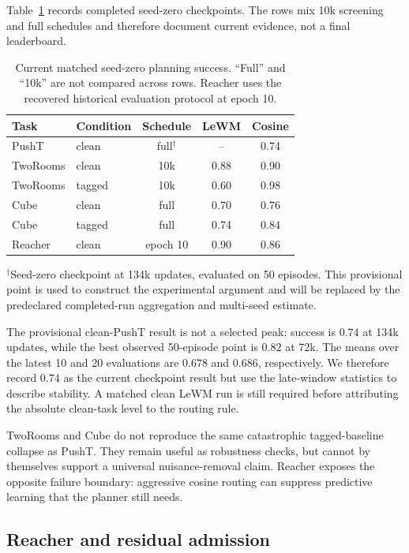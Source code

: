Table~\ref{tab:cross-task} records completed seed-zero checkpoints.  The rows
mix 10k screening and full schedules and therefore document current evidence,
not a final leaderboard.

\begin{table}[t]
\centering
\small
\caption{Current matched seed-zero planning success. ``Full'' and ``10k'' are
not compared across rows. Reacher uses the recovered historical evaluation
protocol at epoch 10.}
\label{tab:cross-task}
\begin{tabular}{llccc}
\toprule
Task & Condition & Schedule & LeWM & Cosine \shortmethod{} \\
\midrule
PushT   & clean  & full$^\dagger$ & --   & 0.74 \\
TwoRooms & clean  & 10k  & 0.88 & 0.90 \\
TwoRooms & tagged & 10k  & 0.60 & 0.98 \\
Cube     & clean  & full & 0.70 & 0.76 \\
Cube     & tagged & full & 0.74 & 0.84 \\
Reacher  & clean  & epoch 10 & 0.90 & 0.86 \\
\bottomrule
\end{tabular}
\vspace{1mm}

\footnotesize{$^\dagger$Seed-zero checkpoint at 134k updates, evaluated on
50 episodes.  This provisional point is used to construct the experimental
argument and will be replaced by the predeclared completed-run aggregation and
multi-seed estimate.}
\end{table}

The provisional clean-PushT result is not a selected peak: success is $0.74$
at 134k updates, while the best observed 50-episode point is $0.82$ at 72k.
The means over the latest 10 and 20 evaluations are $0.678$ and $0.686$,
respectively.  We therefore record $0.74$ as the current checkpoint result but
use the late-window statistics to describe stability.  A matched clean LeWM
run is still required before attributing the absolute clean-task level to the
routing rule.

TwoRooms and Cube do not reproduce the same catastrophic tagged-baseline
collapse as PushT.  They remain useful as robustness checks, but cannot by
themselves support a universal nuisance-removal claim.  Reacher exposes the
opposite failure boundary: aggressive cosine routing can suppress predictive learning that
the planner still needs.

\subsection{Reacher and residual admission}


